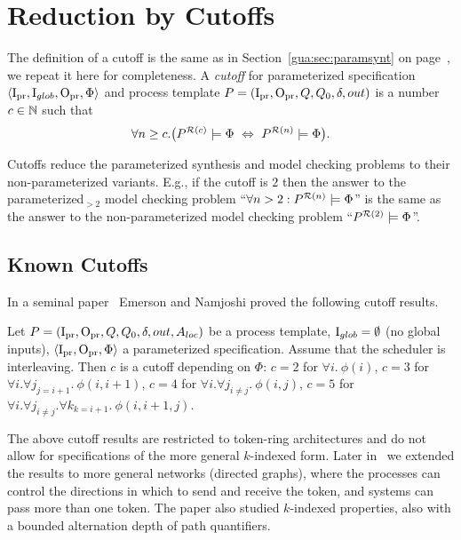 \section{Reduction by Cutoffs}\label{tok_rings:sec:reduction}

The definition of a cutoff is the same as in Section~\ref{gua:sec:paramsynt} on page~\pageref{gua:sec:paramsynt},
we repeat it here for completeness.
A \emph{cutoff} for parameterized specification $\left<{\mathrm{I}_{\mathrm{pr}}},\mathrm{I}_{glob},{\mathrm{O}_{\mathrm{pr}}},\Phi\right>$ 
and process template $P=({\mathrm{I}_{\mathrm{pr}}},{\mathrm{O}_{\mathrm{pr}}},Q,Q_0,\delta,out)$ is a number $c \in \mathbb{N}$ such that
$$
\forall n \geq c. \big(P^{\mathcal {R}(c)} \models \Phi ~\Leftrightarrow~ P^{\mathcal {R}(n)} \models \Phi\big).
$$

Cutoffs reduce the parameterized synthesis and model checking problems to
their non-parameterized variants.
E.g., if the cutoff is $2$
then the answer to the parameterized$_{> 2}$ model checking problem
``$\forall n>2: P^{\mathcal {R}(n)} \models \Phi$''
is the same as the answer to the non-parameterized model checking problem
``$P^{\mathcal {R}(2)} \models \Phi$''.

\subsection*{Known Cutoffs}

  In a seminal paper~\cite{Emerso95b,Emerso03} Emerson and Namjoshi proved the following cutoff results.
  \begin{theorem} \label{tok_rings:thm:cutoffs}
    Let $P=({\mathrm{I}_{\mathrm{pr}}},{\mathrm{O}_{\mathrm{pr}}},Q,Q_0,\delta,out,A_{loc})$ be a process template,
    $\mathrm{I}_{glob}=\emptyset$ (no global inputs),
    $\left<{\mathrm{I}_{\mathrm{pr}}},{\mathrm{O}_{\mathrm{pr}}},\Phi\right>$ a parameterized specification.
    Assume that the scheduler is interleaving.
    Then $c$ is a cutoff depending on $\Phi$:
    \li
    \- $c=2$ for $\forall i.~ \phi(i)$,
    \- $c=3$ for $\forall i.\forall j_{j=i+1}.~ \phi(i,i+1)$,
    \- $c=4$ for $\forall i.\forall j_{i\neq j}.~ \phi(i,j)$,
    \- $c=5$ for $\forall i.\forall j_{i\neq j}.\forall k_{k=i+1}.~ \phi(i,i+1,j)$.
    \il
  \end{theorem}

  The above cutoff results are restricted to token-ring architectures
  and do not allow for specifications of the more general $k$-indexed form.
  Later in~\cite{AJKR14} we extended the results to more general networks (directed graphs),
  where the processes can control the directions in which to send and receive the token,
  and systems can pass more than one token.
  The paper also studied $k$-indexed \CTLstar properties,
  also with a bounded alternation depth of path quantifiers.



